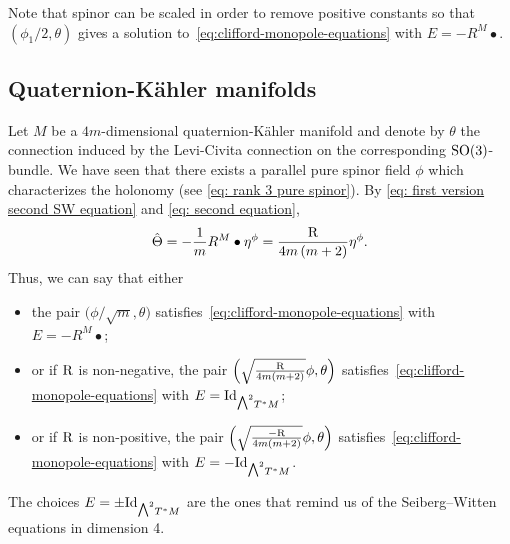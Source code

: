 \documentclass[pdftex]{sigma}
\newcommand{\ext}{\raise1pt\hbox{\small$\bigwedge$}}
\numberwithin{equation}{section}
\begin{document}
\begin{Remark}Note that spinor can be scaled in order to remove positive constants so that $(\phi_1/2,\theta)$ gives a solution to~\eqref{eq:clifford-monopole-equations} with $E=-R^M\bullet$.
\end{Remark}

\subsection{Quaternion-K\"ahler manifolds}
Let $M$ be a $4m$-dimensional quaternion-K\"ahler manifold and denote by $\theta$ the connection induced by the Levi-Civita connection on the corresponding ${\rm SO}(3)$-bundle.
We have seen that there exists a parallel pure spinor field $\phi$ which characterizes the holonomy (see \eqref{eq: rank 3 pure spinor}).
By \eqref{eq: first version second SW equation} and \eqref{eq: second equation},
\begin{gather*}
\hat\Theta = -{1\over m}R^M\bullet \eta^{\phi}= {{\rm R}\over 4m\left(m+2\right)} \eta^{\phi} .
\end{gather*}
Thus, we can say that either
\begin{itemize}\itemsep=0pt
\item the pair $\big( \phi/\sqrt{m},\theta\big)$ satisfies~\eqref{eq:clifford-monopole-equations} with $E=-R^M\bullet$;
\item or if ${\rm R}$ is non-negative, the pair $\Big( \sqrt{{\rm R}\over 4m(m+2)}\phi,\theta\Big)$ satisfies~\eqref{eq:clifford-monopole-equations} with $E={\rm Id}_{\ext^2 T^*M}$;
\item or if ${\rm R}$ is non-positive, the pair $\Big( \sqrt{-{\rm R}\over 4m(m+2)}\phi,\theta\Big)$ satisfies~\eqref{eq:clifford-monopole-equations} with $E=-{\rm Id}_{\ext^2 T^*M}$.
\end{itemize}

\begin{Remark}The choices $E=\pm{\rm Id}_{\ext^2 T^*M}$ are the ones that remind us of the Seiberg--Witten equations in dimension 4.
\end{Remark}
\end{document}
